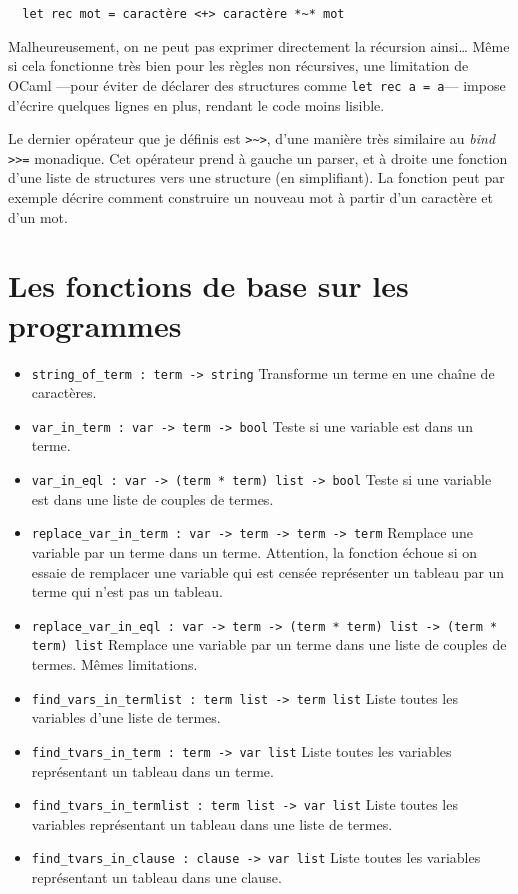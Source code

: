 \documentclass{article}
\begin{document}
\begin{verbatim}
  let rec mot = caractère <+> caractère *~* mot
\end{verbatim}

Malheureusement, on ne peut pas exprimer directement la récursion ainsi\ldots{} Même si cela fonctionne très bien pour les règles non récursives, une limitation de OCaml ---pour éviter de déclarer des structures comme \texttt{let rec a = a}--- impose d'écrire quelques lignes en plus, rendant le code moins lisible.

Le dernier opérateur que je définis est \texttt{>\textasciitilde>}, d'une manière très similaire au \emph{bind} \texttt{>>=} monadique. Cet opérateur prend à gauche un parser, et à droite une fonction d'une liste de structures vers une structure (en simplifiant). La fonction peut par exemple décrire comment construire un nouveau mot à partir d'un caractère et d'un mot.



\section{Les fonctions de base sur les programmes}

\begin{itemize}
  \item
    \texttt{string_of_term : term -> string} Transforme un terme en une chaîne de caractères.
  \item
    \texttt{var_in_term : var -> term -> bool} Teste si une variable est dans un terme.
  \item
    \texttt{var_in_eql : var -> (term * term) list -> bool} Teste si une variable est dans une liste de couples de termes.
  \item
    \texttt{replace_var_in_term : var -> term -> term -> term} Remplace une variable par un terme dans un terme. Attention, la fonction échoue si on essaie de remplacer une variable qui est censée représenter un tableau par un terme qui n'est pas un tableau.
  \item
    \texttt{replace_var_in_eql : var -> term -> (term * term) list -> (term * term) list} Remplace une variable par un terme dans une liste de couples de termes. Mêmes limitations.
  \item
    \texttt{find_vars_in_termlist : term list -> term list} Liste toutes les variables d'une liste de termes.
  \item
    \texttt{find_tvars_in_term : term -> var list} Liste toutes les variables représentant un tableau dans un terme.
  \item
    \texttt{find_tvars_in_termlist : term list -> var list} Liste toutes les variables représentant un tableau dans une liste de termes.
  \item
    \texttt{find_tvars_in_clause : clause -> var list} Liste toutes les variables représentant un tableau dans une clause.
\end{itemize}
\end{document}

